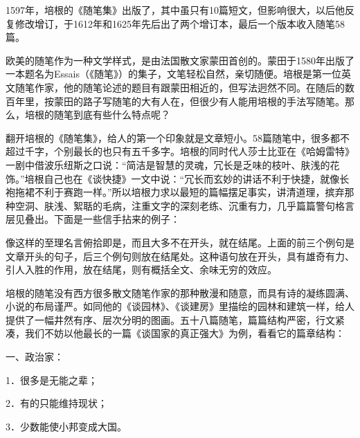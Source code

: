 \par 1597年，培根的《随笔集》出版了，其中虽只有10篇短文，但影响很大，以后他反复修改增订，于1612年和1625年先后出了两个增订本，最后一个版本收入随笔58篇。
\par 欧美的随笔作为一种文学样式，是由法国散文家蒙田首创的。蒙田于1580年出版了一本题名为Essais（《随笔》）的集子，文笔轻松自然，亲切随便。培根是第一位英文随笔作家，他的随笔论述的题目有跟蒙田相近的，但写法迥然不同。在随后的数百年里，按蒙田的路子写随笔的大有人在，但很少有人能用培根的手法写随笔。那么，培根的随笔到底有些什么特点呢？
\par 翻开培根的《随笔集》，给人的第一个印象就是文章短小。58篇随笔中，很多都不超过千字，个别最长的也只有五千多字。培根的同时代人莎士比亚在《哈姆雷特》一剧中借波乐纽斯之口说：“简洁是智慧的灵魂，冗长是乏味的枝叶、肤浅的花饰。”培根自己也在《谈快捷》一文中说：“冗长而玄妙的讲话不利于快捷，就像长袍拖裙不利于赛跑一样。”所以培根力求以最短的篇幅摆足事实，讲清道理，摈弃那种空洞、肤浅、絮聒的毛病，注重文字的深刻老练、沉重有力，几乎篇篇警句格言层见叠出。下面是一些信手拈来的例子：
\par 像这样的至理名言俯拾即是，而且大多不在开头，就在结尾。上面的前三个例句是文章开头的句子，后三个例句则放在结尾处。这种语句放在开头，具有雄奇有力、引人入胜的作用，放在结尾，则有概括全文、余味无穷的效应。
\par 培根的随笔没有西方很多散文随笔作家的那种散漫和随意，而具有诗的凝练圆满、小说的布局谨严。如同他的《谈园林》、《谈建房》里描绘的园林和建筑一样，给人提供了一幅井然有序、层次分明的图画。五十八篇随笔，篇篇结构严密，行文紧凑，我们不妨以他最长的一篇《谈国家的真正强大》为例，看看它的篇章结构：
\par 一、政治家：
\par 1．很多是无能之辈；
\par 2．有的只能维持现状；
\par 3．少数能使小邦变成大国。
